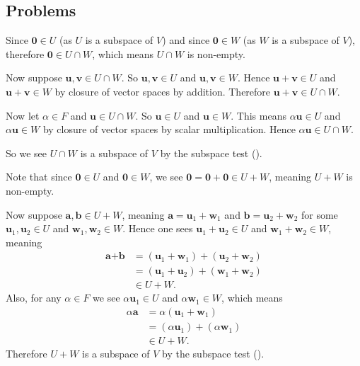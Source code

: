 \subsection*{Problems}
\begin{questions}
    \item \begin{partquestions}{\alph*}
        \item Since $\textbf{0} \in U$ (as $U$ is a subspace of $V$) and since $\textbf{0} \in W$ (as $W$ is a subspace of $V$), therefore $\textbf{0} \in U \cap W$, which means $U \cap W$ is non-empty.

        Now suppose $\textbf{u}, \textbf{v} \in U \cap W$. So $\textbf{u}, \textbf{v} \in U$ and $\textbf{u}, \textbf{v} \in W$. Hence $\textbf{u} + \textbf{v} \in U$ and $\textbf{u} + \textbf{v} \in W$ by closure of vector spaces by addition. Therefore $\textbf{u} + \textbf{v} \in U \cap W$.

        Now let $\alpha \in F$ and $\textbf{u} \in U \cap W$. So $\textbf{u} \in U$ and $\textbf{u} \in W$. This means $\alpha\textbf{u} \in U$ and $\alpha\textbf{u} \in W$ by closure of vector spaces by scalar multiplication. Hence $\alpha\textbf{u} \in U \cap W$.

        So we see $U \cap W$ is a subspace of $V$ by the subspace test ().

        \item Note that since $\textbf{0} \in U$ and $\textbf{0} \in W$, we see $\textbf{0} = \textbf{0} + \textbf{0} \in U + W$, meaning $U + W$ is non-empty.

        Now suppose $\textbf{a}, \textbf{b} \in U + W$, meaning $\textbf{a} = \textbf{u}_1 + \textbf{w}_1$ and $\textbf{b} = \textbf{u}_2 + \textbf{w}_2$ for some $\textbf{u}_1, \textbf{u}_2 \in U$ and $\textbf{w}_1, \textbf{w}_2 \in W$. Hence one sees $\textbf{u}_1 + \textbf{u}_2 \in U$ and $\textbf{w}_1 + \textbf{w}_2 \in W$, meaning
        \begin{align*}
            \textbf{a} + \textbf{b} &= (\textbf{u}_1 + \textbf{w}_1) + (\textbf{u}_2 + \textbf{w}_2)\\
            &= (\textbf{u}_1 + \textbf{u}_2) + (\textbf{w}_1 + \textbf{w}_2)\\
            &\in U + W.
        \end{align*}
        Also, for any $\alpha \in F$ we see $\alpha\textbf{u}_1 \in U$ and $\alpha\textbf{w}_1 \in W$, which means
        \begin{align*}
            \alpha\textbf{a} &= \alpha(\textbf{u}_1 + \textbf{w}_1)\\
            &= (\alpha\textbf{u}_1) + (\alpha\textbf{w}_1)\\
            &\in U + W.
        \end{align*}
        Therefore $U + W$ is a subspace of $V$ by the subspace test ().
    \end{partquestions}


\end{questions}
